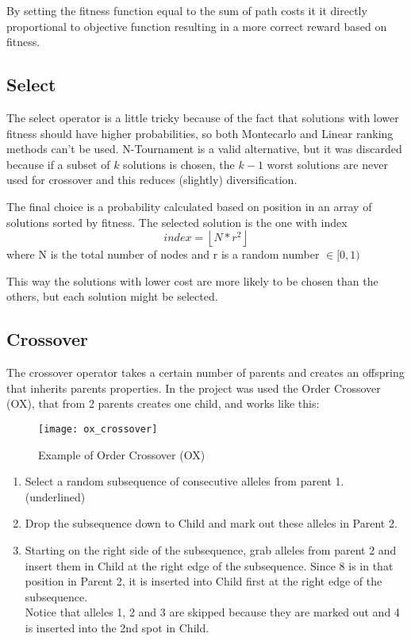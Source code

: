 		By setting the fitness function equal to the sum of path costs it it directly proportional to objective function resulting in a more correct reward based on fitness.
		
	\subsection{Select}
		The select operator is a little tricky because of the fact that solutions with lower fitness should have higher probabilities, so both Montecarlo and Linear ranking methods can't be used. N-Tournament is a valid alternative, but it was discarded because if a subset of $k$ solutions is chosen, the $k-1$ worst solutions are never used for crossover and this reduces (slightly) diversification.
		
		The final choice is a probability calculated based on position in an array of solutions sorted by fitness. The selected solution is the one with index
		\[index = \left \lfloor{N * r^{2}}\right \rfloor\]
		where N is the total number of nodes and r is a random number $\in [0, 1)$
		
		This way the solutions with lower cost are more likely to be chosen than the others, but each solution might be selected.
		
	\subsection{Crossover}
		The crossover operator takes a certain number of parents and creates an offspring that inherits parents properties. In the project was used the Order Crossover (OX), that from 2 parents creates one child, and works like this:
		
		\begin{figure}[h]
		\texttt{[image: ox\_crossover]}
		\centering
		\caption{Example of Order Crossover (OX)}
		\end{figure}
		
		\begin{enumerate}
			\item Select a random subsequence of consecutive alleles from parent 1. (underlined)
			\item Drop the subsequence down to Child and mark out these alleles in Parent 2.
			\item Starting on the right side of the subsequence, grab alleles from parent 2 and insert them in Child at the right edge of the subsequence. Since 8 is in that position in Parent 2, it is inserted into Child first at the right edge of the subsequence.\\
				Notice that alleles 1, 2 and 3 are skipped because they are marked out and 4 is inserted into the 2nd spot in Child.
		\end{enumerate}
		
